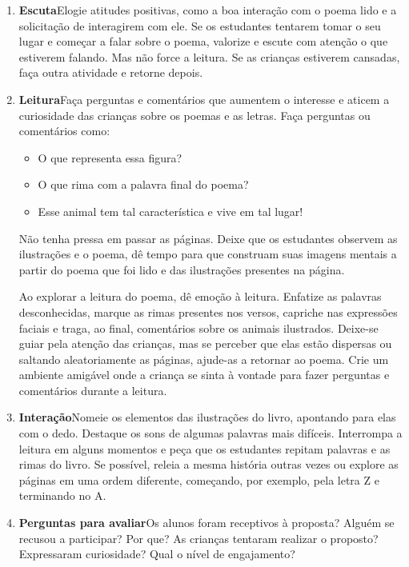 \documentclass[11pt]{extarticle}
\begin{document}
\begin{enumerate}
\item \textbf{Escuta}\quad Elogie atitudes positivas, como 
a boa interação com o poema lido e a solicitação de interagirem com ele. Se os estudantes tentarem 
tomar o seu lugar e começar a falar sobre o poema, valorize e escute com atenção o que estiverem falando. Mas não 
force a leitura. Se as crianças estiverem cansadas, faça outra atividade 
e retorne depois. 

\item \textbf{Leitura}\quad Faça perguntas e comentários que aumentem o 
interesse e aticem a curiosidade das crianças sobre os poemas e as letras. Faça 
perguntas ou comentários como: 

\begin{itemize}
\item O que representa essa figura?
\item O que rima com a palavra final do poema?
\item Esse animal tem tal característica e vive em tal lugar!
\end{itemize}

Não tenha pressa em passar as páginas. Deixe que os estudantes 
observem as ilustrações e o poema, dê tempo para que construam suas imagens 
mentais a partir do poema que foi lido e das ilustrações presentes na página. 

Ao explorar a leitura do poema, dê emoção 
à leitura. Enfatize as palavras desconhecidas, marque as rimas presentes nos versos,
capriche nas expressões faciais e traga, ao final, comentários sobre os animais ilustrados.
Deixe-se guiar pela atenção das crianças, mas se perceber que 
elas estão dispersas ou saltando aleatoriamente as páginas, ajude-as 
a retornar ao poema. Crie um ambiente amigável onde a criança 
se sinta à vontade para fazer perguntas e comentários durante a leitura.

\item \textbf{Interação}\quad Nomeie os elementos das ilustrações 
do livro, apontando para elas com o dedo. Destaque os sons de algumas 
palavras mais difíceis. Interrompa a leitura em alguns momentos e peça que 
os estudantes repitam palavras e as rimas do livro. Se possível, 
releia a mesma história outras vezes ou explore as páginas em uma ordem 
diferente, começando, por exemplo, pela letra Z e terminando no A. 

\item \textbf{Perguntas para avaliar}\quad Os alunos foram receptivos à proposta? Alguém se recusou a participar? Por que? As crianças tentaram realizar o proposto?  Expressaram curiosidade? Qual o nível de engajamento?
\end{enumerate}
\end{document}
